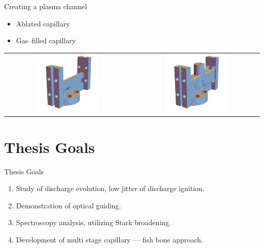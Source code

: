\documentclass[dvipsnames]{beamer}
\begin{document}
\begin{frame}{Creating a plasma channel}
    \begin{itemize}
      \item Ablated capillary
      \item Gas--filled capillary
    \end{itemize}
    \begin{tabular}{cc}
    \includegraphics[width=0.5\textwidth]{figures/theory/ablated.png} & \includegraphics[width=0.5\textwidth]{figures/theory/gasfilled.png}
    \end{tabular}
\end{frame}
\section{Thesis Goals}
\begin{frame}{Thesis Goals}
  \begin{enumerate}
    \item Study of discharge evolution, low jitter of discharge ignition.
    \item Demonstration of optical guiding.
    \item Spectroscopy analysis, utilizing Stark broadening.
    \item Development of multi stage capillary --- fish bone approach.
  \end{enumerate}
\end{frame}
\end{document}

